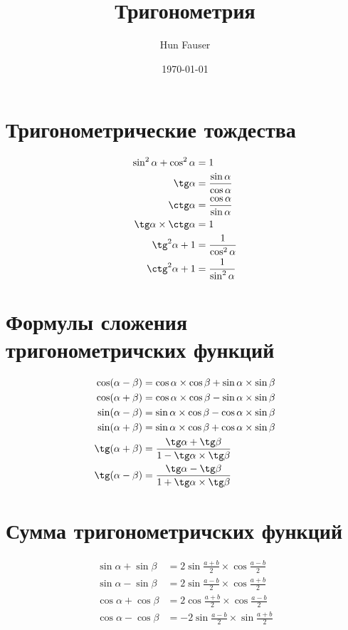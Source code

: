 \documentclass[a4paper,12pt]{article}
\author{Hun Fauser}
\title{Тригонометрия}
\date{\today}
\begin{document}

\maketitle

\section{Тригонометрические тождества}

\begin{align*}
\sin^2\alpha + \cos^2\alpha &= 1 \\
\tg\alpha &= \frac{\sin\alpha}{\cos\alpha} \\ 
\ctg\alpha &= \frac{\cos\alpha}{\sin\alpha} \\
\tg\alpha \times \ctg\alpha &= 1 \\
\tg^2\alpha + 1 &= \frac{1}{\cos^2\alpha} \\
\ctg^2\alpha + 1 &= \frac{1}{\sin^2\alpha} \\
\end{align*}

\section{Формулы сложения тригонометричских функций}

\begin{align*}
\cos(\alpha - \beta) &= \cos\alpha \times \cos\beta + \sin\alpha \times \sin\beta \\
\cos(\alpha + \beta) &= \cos\alpha \times \cos\beta - \sin\alpha \times \sin\beta \\
\sin(\alpha - \beta) &= \sin\alpha \times \cos\beta - \cos\alpha \times \sin\beta \\
\sin(\alpha + \beta) &= \sin\alpha \times \cos\beta + \cos\alpha \times \sin\beta \\
\tg(\alpha + \beta) &= \frac{\tg\alpha + \tg\beta}{1 - \tg\alpha \times \tg\beta} \\
\tg(\alpha - \beta) &= \frac{\tg\alpha - \tg\beta}{1 + \tg\alpha \times \tg\beta} \\
\end{align*}

\section{Сумма тригонометричских функций}

\begin{align*}
\sin\alpha + \sin\beta &= 2\sin\frac{a + b}{2} \times \cos\frac{a - b}{2} \\
\sin\alpha - \sin\beta &= 2\sin\frac{a - b}{2} \times \cos\frac{a + b}{2} \\
\cos\alpha + \cos\beta &= 2\cos\frac{a + b}{2} \times \cos\frac{a - b}{2} \\
\cos\alpha - \cos\beta &= -2\sin\frac{a - b}{2} \times \sin\frac{a + b}{2} \\
\end{align*}
\end{document}
